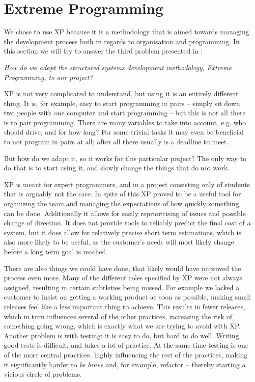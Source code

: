 \section{Extreme Programming}
We chose to use XP because it is a methodology that is aimed towards managing the development process both in regards to organisation and programming. 
In this section we will try to answer the third problem presented in :
\begin{center}
	\textit{How do we adapt the structured systems development methodology, Extreme Programming, to our project?}
\end{center}

\noindent XP is not very complicated to understand, but using it is an entirely different thing. 
It is, for example, easy to start programming in pairs -- simply sit down two people with one computer and start programming -- but this is not all there is to pair programming. 
There are many variables to take into account, e.g. who should drive, and for how long? 
For some trivial tasks it may even be beneficial to not program in pairs at all; after all there usually is a deadline to meet.

But how do we adapt it, so it works for this particular project? 
The only way to do that is to start using it, and slowly change the things that do not work.



XP is meant for expert programmers, and in a project consisting only of students that is arguably not the case. 
In spite of this XP proved to be a useful tool for organizing the team and managing the expectations of how quickly something can be done. 
Additionally it allows for easily reprioritising of issues and possible change of direction. 
It does not provide tools to reliably predict the final cost of a system, but it does allow for relatively precise short term estimations, which is also more likely to be useful, as the customer's needs will most likely change before a long term goal is reached.

There are also things we could have done, that likely would have improved the process even more. 
Many of the different roles specified by XP were not always assigned, resulting in certain subtleties being missed. 
For example we lacked a customer to insist on getting a working product as soon as possible, making small releases feel like a less important thing to achieve. 
This results in fewer releases, which in turn influences several of the other practices, increasing the risk of something going wrong, which is exactly what we are trying to avoid with XP.
Another problem is with testing: it is easy to do, but hard to do well. 
Writing good tests is difficult, and takes a lot of practice. 
At the same time testing is one of the more central practices, highly influencing the rest of the practices, making it significantly harder to \textit{be brave} and, for example, refactor -- thereby starting a vicious circle of problems.

